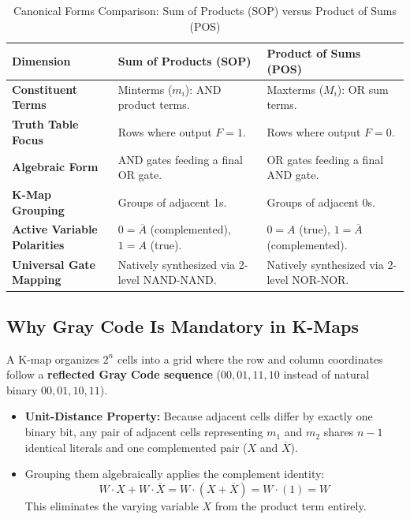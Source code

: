 \begin{table}[htbp]
\centering
\small
\caption{Canonical Forms Comparison: Sum of Products (SOP) versus Product of Sums (POS)}
\label{tab:sop_vs_pos}
\begin{tabularx}{\textwidth}{l X X}
\toprule
\textbf{Dimension} & \textbf{Sum of Products (SOP)} & \textbf{Product of Sums (POS)} \\
\midrule
\textbf{Constituent Terms} & Minterms ($m_i$): AND product terms. & Maxterms ($M_i$): OR sum terms. \\
\textbf{Truth Table Focus} & Rows where output $F = 1$. & Rows where output $F = 0$. \\
\textbf{Algebraic Form} & AND gates feeding a final OR gate. & OR gates feeding a final AND gate. \\
\textbf{K-Map Grouping} & Groups of adjacent 1s. & Groups of adjacent 0s. \\
\textbf{Active Variable Polarities} & $0 = \overline{A}$ (complemented), $1 = A$ (true). & $0 = A$ (true), $1 = \overline{A}$ (complemented). \\
\textbf{Universal Gate Mapping} & Natively synthesized via 2-level NAND-NAND. & Natively synthesized via 2-level NOR-NOR. \\
\bottomrule
\end{tabularx}
\end{table}

\subsection{Why Gray Code Is Mandatory in K-Maps}
A K-map organizes $2^n$ cells into a grid where the row and column coordinates follow a \textbf{reflected Gray Code sequence} ($00, 01, 11, 10$ instead of natural binary $00, 01, 10, 11$).
\begin{itemize}
    \item \textbf{Unit-Distance Property:} Because adjacent cells differ by exactly one binary bit, any pair of adjacent cells representing $m_1$ and $m_2$ shares $n-1$ identical literals and one complemented pair ($X$ and $\overline{X}$).
    \item Grouping them algebraically applies the complement identity:
    \[ W \cdot X + W \cdot \overline{X} = W \cdot (X + \overline{X}) = W \cdot (1) = W \]
    This eliminates the varying variable $X$ from the product term entirely.
\end{itemize}

